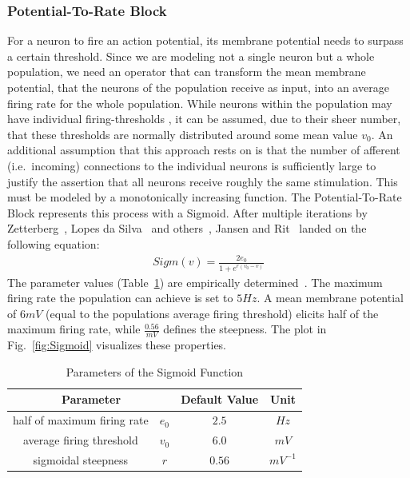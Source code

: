 \subsubsection{Potential-To-Rate Block}
For a neuron to fire an action potential, its membrane potential needs to surpass a certain threshold.
Since we are modeling not a single neuron but a whole population, we need an operator that can transform
the mean membrane potential, that the neurons of the population receive as input, into an average firing rate
for the whole population.
While neurons within the population may have individual firing-thresholds \citationneeded,
it can be assumed, due to their sheer number,
that these thresholds are normally distributed around some mean value $v_0$. \citationneeded
An additional assumption that this approach rests on
is that the number of afferent (i.e.\ incoming) connections to the individual neurons is sufficiently
large to justify the assertion that all neurons receive roughly the same stimulation.
This must be modeled by a monotonically increasing function.
The Potential-To-Rate Block represents this process with a Sigmoid.
After multiple iterations by Zetterberg~\cite{zetterberg_performance_1978},
Lopes da Silva~\cite{lopes_da_silva_models_1976} and others~\cite{van_rotterdam_model_1982},
Jansen and Rit~\cite{jansen_neurophysiologically-based_1993,
    jansen_electroencephalogram_1995} landed on the following equation:
\begin{align}
    Sigm(v) = \frac{2e_0}{1+e^{r(v_0-v)}} \label{eq:SigmJansenRit}
\end{align}
The parameter values (Table~\ref{tab:sigmoid_params}) are empirically
determined~\parencite{jansen_neurophysiologically-based_1993}.
The maximum firing rate the population can achieve is set to $5 Hz$.
A mean membrane potential of $6 mV$ (equal to the populations average firing threshold) elicits half
of the maximum firing rate, while $\frac{0.56}{mV}$ defines the steepness.
The plot in Fig.~\ref{fig:Sigmoid} visualizes these properties.
\begin{table}[H]
    \centering
    \begin{tabular}{ |c|c|c|c| }
        \hline
        \multicolumn{2}{|c|}{Parameter} & Default Value & Unit \\
        \hline
        \hline
        half of maximum firing rate & \(e_0\) & \(2.5\)  & \(Hz\)      \\
        \hline
        average firing threshold    & \(v_0\) & \(6.0\)  & \(mV\)      \\
        \hline
        sigmoidal steepness         & \(r\)   & \(0.56\) & \(mV^{-1}\) \\
        \hline
    \end{tabular}
    \caption{Parameters of the Sigmoid Function}
    \label{tab:sigmoid_params}
\end{table}

